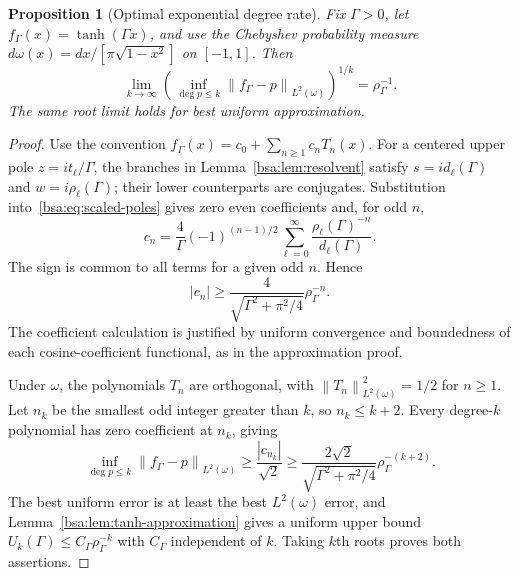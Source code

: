 \documentclass[11pt,letterpaper]{article}
\newcommand{\bsaNorm}[1]{\left\lVert #1\right\rVert}
\newtheorem{bsaProposition}{Proposition}[section]
\theoremstyle{remark}
\theoremstyle{plain}
\begin{document}
\begin{bsaProposition}[Optimal exponential degree rate]
\label{bsa:prop:rate-sharp}
Fix $\Gamma>0$, let $f_\Gamma(x)=\tanh(\Gamma x)$, and use the Chebyshev probability measure
$d\omega(x)=dx/[\pi\sqrt{1-x^2}]$ on $[-1,1]$. Then
\begin{equation}
 \lim_{k\to\infty}
 \left(\inf_{\deg p\le k}\bsaNorm{f_\Gamma-p}_{L^2(\omega)}\right)^{1/k}
 =\rho_\Gamma^{-1}.
 \label{bsa:eq:rate-sharp}
\end{equation}
The same root limit holds for best uniform approximation.
\end{bsaProposition}
\begin{proof}
Use the convention $f_\Gamma(x)=c_0+\sum_{n\ge1}c_nT_n(x)$. For a centered upper pole $z=i t_\ell/\Gamma$, the branches in Lemma~\ref{bsa:lem:resolvent} satisfy
$s=i d_\ell(\Gamma)$ and $w=i\rho_\ell(\Gamma)$; their lower counterparts are conjugates. Substitution into~\eqref{bsa:eq:scaled-poles} gives zero even coefficients and, for odd $n$,
\begin{equation}
 c_n=\frac4\Gamma(-1)^{(n-1)/2}
 \sum_{\ell=0}^{\infty}\frac{\rho_\ell(\Gamma)^{-n}}{d_\ell(\Gamma)}.
 \label{bsa:eq:centered-chebyshev}
\end{equation}
The sign is common to all terms for a given odd $n$. Hence
\begin{equation}
 |c_n|\ge\frac4{\sqrt{\Gamma^2+\pi^2/4}}\rho_\Gamma^{-n}.
 \label{bsa:eq:coefficient-lower}
\end{equation}
The coefficient calculation is justified by uniform convergence and boundedness of each cosine-coefficient functional, as in the approximation proof.

Under $\omega$, the polynomials $T_n$ are orthogonal, with $\bsaNorm{T_n}_{L^2(\omega)}^2=1/2$ for $n\ge1$. Let $n_k$ be the smallest odd integer greater than $k$, so $n_k\le k+2$. Every degree-$k$ polynomial has zero coefficient at $n_k$, giving
\begin{equation}
 \inf_{\deg p\le k}\bsaNorm{f_\Gamma-p}_{L^2(\omega)}
 \ge\frac{|c_{n_k}|}{\sqrt2}
 \ge\frac{2\sqrt2}{\sqrt{\Gamma^2+\pi^2/4}}\rho_\Gamma^{-(k+2)}.
 \label{bsa:eq:approximation-lower}
\end{equation}
The best uniform error is at least the best $L^2(\omega)$ error, and Lemma~\ref{bsa:lem:tanh-approximation} gives a uniform upper bound $U_k(\Gamma)\le C_\Gamma\rho_\Gamma^{-k}$ with $C_\Gamma$ independent of $k$. Taking $k$th roots proves both assertions.
\end{proof}
\end{document}
